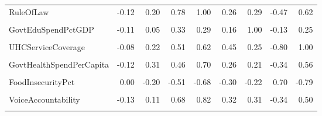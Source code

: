 \documentclass[
]{article}
\begin{document}
\begin{table}
{\begin{tabular}[t]{lrrrrrrrr}
RuleOfLaw & -0.12 & 0.20 & 0.78 & 1.00 & 0.26 & 0.29 & -0.47 & 0.62\\
\addlinespace
\cellcolor{gray!10}{RqdEduYears} & \cellcolor{gray!10}{-0.11} & \cellcolor{gray!10}{0.13} & \cellcolor{gray!10}{0.20} & \cellcolor{gray!10}{0.26} & \cellcolor{gray!10}{1.00} & \cellcolor{gray!10}{0.16} & \cellcolor{gray!10}{-0.35} & \cellcolor{gray!10}{0.45}\\
GovtEduSpendPctGDP & -0.11 & 0.05 & 0.33 & 0.29 & 0.16 & 1.00 & -0.13 & 0.25\\
\cellcolor{gray!10}{MortalityFromDirtyness} & \cellcolor{gray!10}{0.14} & \cellcolor{gray!10}{-0.12} & \cellcolor{gray!10}{-0.45} & \cellcolor{gray!10}{-0.47} & \cellcolor{gray!10}{-0.35} & \cellcolor{gray!10}{-0.13} & \cellcolor{gray!10}{1.00} & \cellcolor{gray!10}{-0.80}\\
UHCServiceCoverage & -0.08 & 0.22 & 0.51 & 0.62 & 0.45 & 0.25 & -0.80 & 1.00\\
\cellcolor{gray!10}{HealthSpendPerCapita} & \cellcolor{gray!10}{-0.12} & \cellcolor{gray!10}{0.40} & \cellcolor{gray!10}{0.46} & \cellcolor{gray!10}{0.71} & \cellcolor{gray!10}{0.28} & \cellcolor{gray!10}{0.20} & \cellcolor{gray!10}{-0.35} & \cellcolor{gray!10}{0.58}\\
\addlinespace
GovtHealthSpendPerCapita & -0.12 & 0.31 & 0.46 & 0.70 & 0.26 & 0.21 & -0.34 & 0.56\\
\cellcolor{gray!10}{MigrantsPct} & \cellcolor{gray!10}{-0.03} & \cellcolor{gray!10}{0.01} & \cellcolor{gray!10}{0.36} & \cellcolor{gray!10}{0.42} & \cellcolor{gray!10}{0.11} & \cellcolor{gray!10}{-0.01} & \cellcolor{gray!10}{NA} & \cellcolor{gray!10}{0.35}\\
FoodInsecurityPct & 0.00 & -0.20 & -0.51 & -0.68 & -0.30 & -0.22 & 0.70 & -0.79\\
\cellcolor{gray!10}{RuralPopulGrowth} & \cellcolor{gray!10}{0.07} & \cellcolor{gray!10}{-0.07} & \cellcolor{gray!10}{-0.31} & \cellcolor{gray!10}{-0.31} & \cellcolor{gray!10}{-0.12} & \cellcolor{gray!10}{-0.08} & \cellcolor{gray!10}{0.49} & \cellcolor{gray!10}{-0.46}\\
VoiceAccountability & -0.13 & 0.11 & 0.68 & 0.82 & 0.32 & 0.31 & -0.34 & 0.50\\
\addlinespace
\cellcolor{gray!10}{Homicides} & \cellcolor{gray!10}{-0.07} & \cellcolor{gray!10}{-0.08} & \cellcolor{gray!10}{-0.18} & \cellcolor{gray!10}{-0.31} & \cellcolor{gray!10}{0.09} & \cellcolor{gray!10}{-0.04} & \cellcolor{gray!10}{0.11} & \cellcolor{gray!10}{-0.07}\\
\bottomrule

\end{tabular}}
\end{table}
\end{document}
